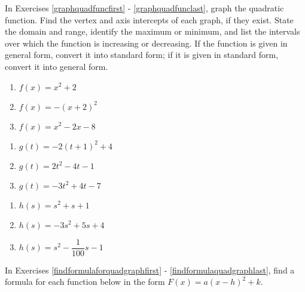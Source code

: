 In Exercises \ref{graphquadfuncfirst} - \ref{graphquadfunclast}, graph the quadratic function.  Find the vertex and axis intercepts of each graph, if they exist.  State the domain and range, identify the maximum or minimum, and list the intervals over which the function is increasing or decreasing.  If the function is given in general form, convert it into standard form; if it is given in standard form, convert it into general form.  

\begin{multicols}{3}
\begin{enumerate}

\item $f(x) = x^{2} + 2$ \label{graphquadfuncfirst}
\item $f(x) = -(x + 2)^{2}$
\item $f(x) = x^{2} - 2x - 8$

\setcounter{HW}{\value{enumi}}
\end{enumerate}
\end{multicols}

\begin{multicols}{3}
\begin{enumerate}
\setcounter{enumi}{\value{HW}}

\item $g(t) = -2(t + 1)^{2} + 4$
\item $g(t) = 2t^2 - 4t - 1$
\item $g(t) = -3t^{2} + 4t - 7$

\setcounter{HW}{\value{enumi}}
\end{enumerate}
\end{multicols}

\begin{multicols}{3}
\begin{enumerate}
\setcounter{enumi}{\value{HW}}

\item  $h(s) = s^2 + s + 1$

\item  $h(s)  = -3s^2+5s+4$

\item $h(s) = s^{2} - \dfrac{1}{100} s - 1$ \label{graphquadfunclast}

\setcounter{HW}{\value{enumi}}
\end{enumerate}
\end{multicols}

In Exercises \ref{findformulaforquadgraphfirst} - \ref{findformulaquadgraphlast}, find a formula for each function below in the form $F(x) = a(x-h)^2+k$.

